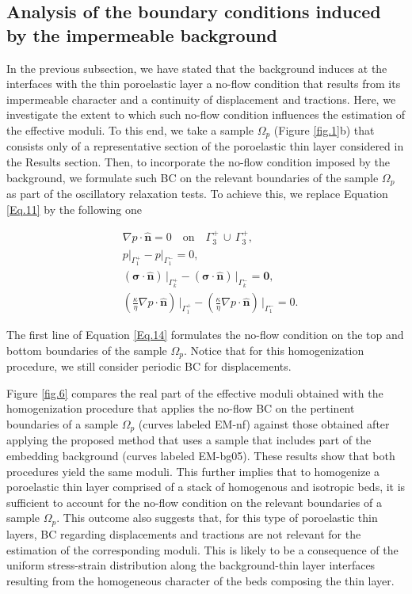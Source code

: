\documentclass[draft]{agujournal2019}
\begin{document}
\subsection{Analysis of the boundary conditions induced by the impermeable background} 
In the previous subsection, we have stated that the background induces at the interfaces with the thin poroelastic layer a no-flow condition that results from its impermeable character and a continuity of displacement and tractions. Here, we investigate the extent to which such no-flow condition influences the estimation of the effective moduli. To this end, we  take a sample $\Omega_p$ (Figure \ref{fig.1}b) that consists only of a representative section  of the poroelastic thin layer considered in the Results section. Then, to incorporate the no-flow condition imposed by the background, we formulate such BC on the relevant boundaries of the sample $\Omega_p$ as part of the  oscillatory relaxation tests. To achieve this, we replace Equation \ref{Eq.11} by the following one
\begin{linenomath*}
\begin{equation}\label{Eq.14}
\begin{split}
& \nabla p \cdot \bm{\hat n}  = 0 \quad \text{on}\quad \Gamma_3^+ \, \cup \, \Gamma_3^+,\\
& p\vert_{\Gamma_1^+}-p\vert_{\Gamma_1^-} =0, \\
& \left(\bm{\sigma}\cdot \bm{\hat n} \right)\, \vert_{\Gamma_k^+}-\left(\bm{\sigma}\cdot \bm{\hat n} \right)\, \vert_{\Gamma_k^-} = \bm{0},\\
&\left( \frac{\kappa}{\eta} \nabla p \cdot \bm{\hat n} \right) \, \vert_{\Gamma_1^+} -\left( \frac{\kappa}{\eta} \nabla p \cdot \bm{\hat n} \right) \, \vert_{\Gamma_1^-} = 0.
\end{split}
\end{equation}
\end{linenomath*}
The first line of Equation \eqref{Eq.14} formulates the no-flow condition on the top and bottom boundaries of the sample $\Omega_p$. Notice that for this homogenization procedure, we still consider periodic BC for displacements. 

Figure \ref{fig.6} compares the real part of the effective moduli obtained with the homogenization procedure that applies the no-flow BC on the pertinent boundaries of a sample  $\Omega_p$ (curves labeled EM-nf) against those obtained after applying the proposed method that uses a sample that includes part of the embedding background (curves labeled EM-bg05). These results show that both procedures yield the same moduli. This further implies that to homogenize a poroelastic thin layer comprised of a stack of homogenous and isotropic beds, it is sufficient to account for the no-flow condition on the relevant boundaries of a sample $\Omega_p$. This outcome also suggests that, for this type of poroelastic thin layers, BC regarding displacements and tractions are not relevant for the estimation of the corresponding moduli. This is likely to be a consequence of the uniform stress-strain distribution along the background-thin layer interfaces resulting from the homogeneous character of the beds composing the thin layer.
\end{document}

